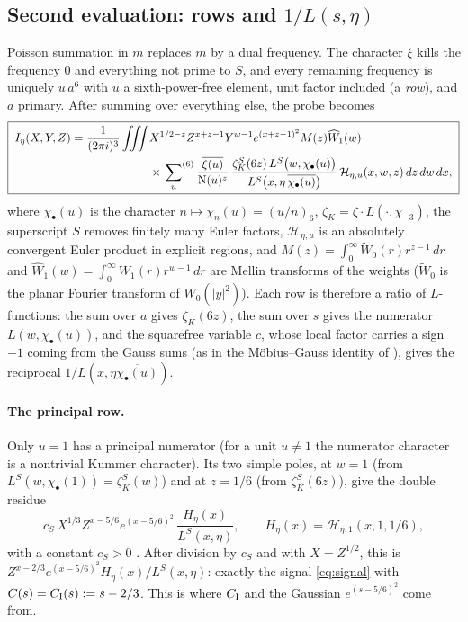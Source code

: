 \documentclass[11pt]{article}
\newcommand{\N}{\mathrm N}
\newcommand{\ch}{\chi_{-3}}
\newcommand{\sixsum}{\sideset{}{^{(6)}}\sum}
\begin{document}
\subsection{Second evaluation: rows and \texorpdfstring{$1/L(s,\eta)$}{1/L(s,eta)}}\label{sec:high}
Poisson summation in $m$ replaces $m$ by a dual frequency. The character
$\xi$ kills the frequency $0$ and everything not prime to $S$, and every
remaining frequency is uniquely $u\,a^6$ with $u$ a sixth-power-free element,
unit factor included (a \emph{row}), and $a$ primary. After summing over everything else, the
probe becomes \cite[L3831 and eq.\ probe-high]{OAI78}
\begin{equation}\label{eq:poisson}
\boxed{\;
\begin{aligned}
 I_\eta(X,Y,Z)=\frac1{(2\pi i)^3}\iiint
 &X^{1/2-z}Z^{x+z-1}Y^{w-1}e^{(x+z-1)^2}M(z)\widehat W_1(w)\\
 &\times\sixsum_{u}\frac{\overline{\xi(u)}}{\N(u)^{z}}\,
 \frac{\zeta_K^S(6z)\,L^S\bigl(w,\chi_\bullet(u)\bigr)}
      {L^S\bigl(x,\eta\,\overline{\chi_\bullet(u)}\bigr)}\,
 \mathcal H_{\eta,u}(x,w,z)\,dz\,dw\,dx,
\end{aligned}\;}
\end{equation}
where $\chi_\bullet(u)$ is the character $n\mapsto\chi_n(u)=(u/n)_6$,
$\zeta_K=\zeta\cdot L(\cdot,\ch)$, the superscript $S$ removes finitely many
Euler factors, $\mathcal H_{\eta,u}$ is an absolutely convergent Euler
product in explicit regions, and $M(z)=\int_0^\infty\widetilde W_0(r)r^{z-1}\,dr$ and
$\widehat W_1(w)=\int_0^\infty W_1(r)r^{w-1}\,dr$ are Mellin transforms of the weights
($\widetilde W_0$ is the planar Fourier transform of $W_0(|y|^2)$). Each row is therefore a ratio of
$L$-functions: the sum over $a$ gives $\zeta_K(6z)$, the sum over $s$ gives the numerator
$L(w,\chi_\bullet(u))$, and the squarefree variable $c$, whose local factor carries a sign
$-1$ coming from the Gauss sums (as in the M\"obius--Gauss identity of \cite[Section 6]{guide1112}), gives the reciprocal
$1/L(x,\eta\overline{\chi_\bullet(u)})$.

\paragraph{The principal row.} Only $u=1$ has a principal numerator (for a unit
$u\ne1$ the numerator character is a nontrivial Kummer character). Its two simple poles,
at $w=1$ (from $L^S(w,\chi_\bullet(1))=\zeta_K^S(w)$) and at $z=1/6$ (from $\zeta_K^S(6z)$),
give the double residue
\[
 c_S\,X^{1/3}Z^{x-5/6}e^{(x-5/6)^2}\,\frac{H_\eta(x)}{L^S(x,\eta)},\qquad
 H_\eta(x)=\mathcal H_{\eta,1}(x,1,1/6),
\]
with a constant $c_S>0$ \cite[eq.\ shared-principal-data]{OAI78}. After division by $c_S$
and with $X=Z^{1/2}$, this is $Z^{x-2/3}e^{(x-5/6)^2}H_\eta(x)/L^S(x,\eta)$:
exactly the signal \eqref{eq:signal} with $C(s)=C_{\rm I}(s):=s-2/3$. This is where
$C_{\rm I}$ and the Gaussian $e^{(s-5/6)^2}$ come from.
\end{document}
